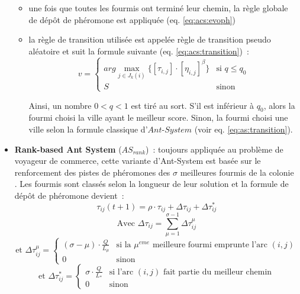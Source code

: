 \begin{itemize}
\begin{itemize}
    \item une fois que toutes les fourmis ont terminé leur chemin, la règle globale de dépôt de phéromone est appliquée (eq. \ref{eq:acs:evoph})
    \item la règle de transition utilisée est appelée règle de transition pseudo aléatoire et suit la formule suivante (eq. \ref{eq:acs:transition})~: 
    \begin{equation} 
      v = \begin{cases}
           arg \max\limits_{j \in J_k(i)} \{ [\tau_{i,j}]\cdot[\eta_{i,j}]^\beta\} & \text{si } q\leq q_0\\
           S & \text{sinon}
          \end{cases}
     \label{eq:acs:transition}
    \end{equation}
    
    Ainsi, un nombre $0<q<1$ est tiré au sort. S'il est inférieur à $q_0$, alors la fourmi choisi la ville ayant le meilleur score. Sinon, la fourmi choisi une ville selon la formule classique d'$Ant$-$System$ (voir eq. \ref{eq:as:transition}).
  \end{itemize}
  \item \textbf{Rank-based Ant System} ($AS_{rank}$)~: toujours appliquée au problème de voyageur de commerce, cette variante d'Ant-System est basée sur le renforcement des pistes de phéromones des $\sigma$ meilleures fourmis de la colonie \cite{Bullnheimer1997}. Les fourmis sont classés selon la longueur de leur solution et la formule de dépôt de phéromone devient~: 
    \begin{equation}
      \tau_{ij}(t+1) = \rho \cdot \tau_{ij} + \Delta\tau_{ij} + \Delta\tau^*_{ij}
    \end{equation}
    \begin{equation*}
      \text{Avec }\Delta\tau_{ij} = \sum\limits_{\mu=1}^{\sigma-1} \Delta\tau^{\mu}_{ij}
    \end{equation*}
    \begin{equation*}
      \text{et }\Delta\tau_{ij}^{\mu} = 
      \begin{cases}
	(\sigma - \mu) \cdot \frac{Q}{L_{\mu}} & \text{si la } \mu^{eme} \text{ meilleure fourmi emprunte l'arc } (i,j) \\
	0 & \text{sinon}
      \end{cases}
    \end{equation*}
    \begin{equation*}
      \text{et }\Delta\tau_{ij}^{*} = 
      \begin{cases}
	\sigma \cdot \frac{Q}{L_{*}} & \text{si l'arc } (i,j) \text{ fait partie du meilleur chemin} \\
	0 & \text{sinon}
      \end{cases}
    \end{equation*}
 \end{itemize}


